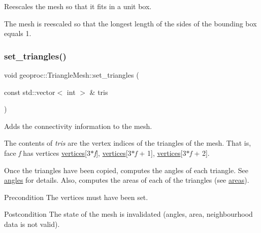 Reescales the mesh so that it fits in a unit box. 

The mesh is reescaled so that the longest length of the sides of the bounding box equals 1. \mbox{\label{classgeoproc_1_1TriangleMesh_a5e35cad5c18195e6397f22bc951161f1}} 
\subsubsection{\texorpdfstring{set\+\_\+triangles()}{set\_triangles()}}
{\footnotesize\ttfamily void geoproc\+::\+Triangle\+Mesh\+::set\+\_\+triangles (\begin{DoxyParamCaption}\item[{const std\+::vector$<$ int $>$ \&}]{tris }\end{DoxyParamCaption})}



Adds the connectivity information to the mesh. 

The contents of {\itshape tris} are the vertex indices of the triangles of the mesh. That is, face {\itshape f} has vertices \hyperlink{classgeoproc_1_1TriangleMesh_a82c3351de37daa9440f53597f080992d}{vertices}\mbox{[}3$\ast${\itshape f}\mbox{]}, \hyperlink{classgeoproc_1_1TriangleMesh_a82c3351de37daa9440f53597f080992d}{vertices}\mbox{[}3$\ast${\itshape f} + 1\mbox{]}, \hyperlink{classgeoproc_1_1TriangleMesh_a82c3351de37daa9440f53597f080992d}{vertices}\mbox{[}3$\ast${\itshape f} + 2\mbox{]}.

Once the triangles have been copied, computes the angles of each triangle. See \hyperlink{classgeoproc_1_1TriangleMesh_ab255af87d20d76ad84246560fa3579b3}{angles} for details. Also, computes the areas of each of the triangles (see \hyperlink{classgeoproc_1_1TriangleMesh_a684ecaaa03f1739856bba03167e51dd1}{areas}).

\begin{DoxyPrecond}{Precondition}
The vertices must have been set. 
\end{DoxyPrecond}
\begin{DoxyPostcond}{Postcondition}
The state of the mesh is invalidated (angles, area, neighbourhood data is not valid). 
\end{DoxyPostcond}
\mbox{\label{classgeoproc_1_1TriangleMesh_aa9ca26f1ededecd289d1a8800dca2c23}} 
